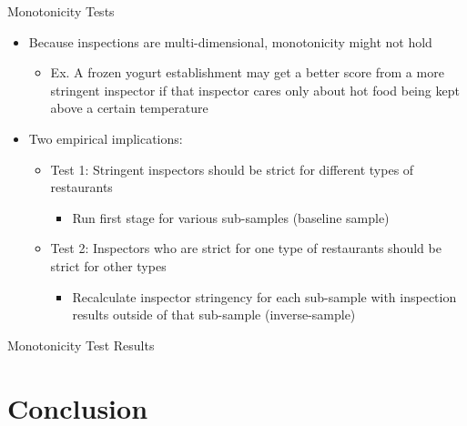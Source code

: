 \documentclass{beamer}
\begin{document}
\begin{frame}{Monotonicity Tests}
\begin{itemize}
\item Because inspections are multi-dimensional, monotonicity might not hold
\begin{itemize}
\item Ex. A frozen yogurt establishment may get a better score from a more stringent inspector if that inspector cares only about hot food being kept above a certain temperature
\end{itemize}
\item Two empirical implications:
\begin{itemize}
\item Test 1: Stringent inspectors should be strict for different types of restaurants 
\begin{itemize}
\item Run first stage for various sub-samples (baseline sample)
\end{itemize}
\item Test 2: Inspectors who are strict for one type of restaurants should be strict for other types
\begin{itemize}
\item Recalculate inspector stringency for each sub-sample with inspection results outside of that sub-sample (inverse-sample)
\end{itemize}
\end{itemize}
\end{itemize}
\end{frame}
\begin{frame}{Monotonicity Test Results}
\begin{table}[h!]
\scalebox{0.45}{  }

\scalebox{0.45}{  }

\scalebox{0.45}{   }

\scalebox{0.45}{   }
\end{table}
\end{frame}

\section{Conclusion}
\end{document}
